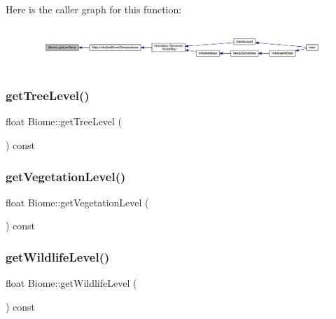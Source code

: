 Here is the caller graph for this function\+:
\nopagebreak
\begin{figure}[H]
\begin{center}
\leavevmode
\includegraphics[width=350pt]{d6/dd0/class_biome_afd3fa2df745d92eb95aaf8b58d119ca5_icgraph}
\end{center}
\end{figure}
\mbox{\label{class_biome_a45a00d5de84b75a3e4ef3dd00a08e71a}} 
\subsubsection{\texorpdfstring{get\+Tree\+Level()}{getTreeLevel()}}
{\footnotesize\ttfamily float Biome\+::get\+Tree\+Level (\begin{DoxyParamCaption}{ }\end{DoxyParamCaption}) const}

\mbox{\label{class_biome_a3420593bad6a5c11dbbb7dc291409649}} 
\subsubsection{\texorpdfstring{get\+Vegetation\+Level()}{getVegetationLevel()}}
{\footnotesize\ttfamily float Biome\+::get\+Vegetation\+Level (\begin{DoxyParamCaption}{ }\end{DoxyParamCaption}) const}

\mbox{\label{class_biome_a7041bd17e9ae2e15ab8a91b74fc4c83a}} 
\subsubsection{\texorpdfstring{get\+Wildlife\+Level()}{getWildlifeLevel()}}
{\footnotesize\ttfamily float Biome\+::get\+Wildlife\+Level (\begin{DoxyParamCaption}{ }\end{DoxyParamCaption}) const}

